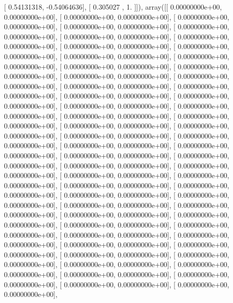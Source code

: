 \documentclass{article}
\begin{document}
       [ 0.54131318, -0.54064636],
       [ 0.305027  ,  1.        ]]), array([[  0.00000000e+00,   0.00000000e+00],
       [  0.00000000e+00,   0.00000000e+00],
       [  0.00000000e+00,   0.00000000e+00],
       [  0.00000000e+00,   0.00000000e+00],
       [  0.00000000e+00,   0.00000000e+00],
       [  0.00000000e+00,   0.00000000e+00],
       [  0.00000000e+00,   0.00000000e+00],
       [  0.00000000e+00,   0.00000000e+00],
       [  0.00000000e+00,   0.00000000e+00],
       [  0.00000000e+00,   0.00000000e+00],
       [  0.00000000e+00,   0.00000000e+00],
       [  0.00000000e+00,   0.00000000e+00],
       [  0.00000000e+00,   0.00000000e+00],
       [  0.00000000e+00,   0.00000000e+00],
       [  0.00000000e+00,   0.00000000e+00],
       [  0.00000000e+00,   0.00000000e+00],
       [  0.00000000e+00,   0.00000000e+00],
       [  0.00000000e+00,   0.00000000e+00],
       [  0.00000000e+00,   0.00000000e+00],
       [  0.00000000e+00,   0.00000000e+00],
       [  0.00000000e+00,   0.00000000e+00],
       [  0.00000000e+00,   0.00000000e+00],
       [  0.00000000e+00,   0.00000000e+00],
       [  0.00000000e+00,   0.00000000e+00],
       [  0.00000000e+00,   0.00000000e+00],
       [  0.00000000e+00,   0.00000000e+00],
       [  0.00000000e+00,   0.00000000e+00],
       [  0.00000000e+00,   0.00000000e+00],
       [  0.00000000e+00,   0.00000000e+00],
       [  0.00000000e+00,   0.00000000e+00],
       [  0.00000000e+00,   0.00000000e+00],
       [  0.00000000e+00,   0.00000000e+00],
       [  0.00000000e+00,   0.00000000e+00],
       [  0.00000000e+00,   0.00000000e+00],
       [  0.00000000e+00,   0.00000000e+00],
       [  0.00000000e+00,   0.00000000e+00],
       [  0.00000000e+00,   0.00000000e+00],
       [  0.00000000e+00,   0.00000000e+00],
       [  0.00000000e+00,   0.00000000e+00],
       [  0.00000000e+00,   0.00000000e+00],
       [  0.00000000e+00,   0.00000000e+00],
       [  0.00000000e+00,   0.00000000e+00],
       [  0.00000000e+00,   0.00000000e+00],
       [  0.00000000e+00,   0.00000000e+00],
       [  0.00000000e+00,   0.00000000e+00],
       [  0.00000000e+00,   0.00000000e+00],
       [  0.00000000e+00,   0.00000000e+00],
       [  0.00000000e+00,   0.00000000e+00],
       [  0.00000000e+00,   0.00000000e+00],
       [  0.00000000e+00,   0.00000000e+00],
       [  0.00000000e+00,   0.00000000e+00],
       [  0.00000000e+00,   0.00000000e+00],
       [  0.00000000e+00,   0.00000000e+00],
       [  0.00000000e+00,   0.00000000e+00],
       [  0.00000000e+00,   0.00000000e+00],
       [  0.00000000e+00,   0.00000000e+00],
       [  0.00000000e+00,   0.00000000e+00],
\end{document}

